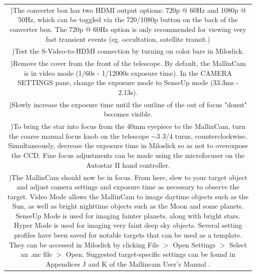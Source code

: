 \documentclass[12pt,titlepage]{article}
\newcounter{rowcount}
\newcommand{\step}{\stepcounter{rowcount}\therowcount)\hspace*{\tabcolsep}}
\begin{document}
\begin{longtable}{c}    
    \multicolumn{1}{m{\textwidth}}{\step The converter box has two HDMI output options: 720p @ 60Hz and 1080p @ 50Hz, which can be toggled via the 720/1080p button on the back of the converter box. The 720p @ 60Hz option is only recommended for viewing very fast transient events (eg. occultation, satellite transit.)} \\[2em]
    
    \multicolumn{1}{m{\textwidth}}{\step Test the S-Video-to-HDMI connection by turning on color bars in Miloslick.} \\
    
    \multicolumn{1}{m{\textwidth}}{\step Remove the cover from the front of the telescope. By default, the MallinCam is in video mode (1/60s - 1/12000s exposure time). In the CAMERA SETTINGS pane, change the exposure mode to SenseUp mode (33.3ms - 2.13s).} \\
   
    \multicolumn{1}{m{\textwidth}}{\step Slowly increase the exposure time until the outline of the out of focus "donut" becomes visible.}\\
    
    \multicolumn{1}{m{\textwidth}}{\step To bring the star into focus from the 40mm eyepiece to the MallinCam, turn the coarse manual focus knob on the telescope $\sim$3 3/4 turns, counterclockwise. Simultaneously, decrease the exposure time in Miloslick so as not to overexpose the CCD. Fine focus adjustments can be made using the microfocuser on the Autostar II hand controller.}\\
    
   \multicolumn{1}{m{\textwidth}}{\step The MallinCam should now be in focus. From here, slew to your target object and adjust camera settings and exposure time as necessary to observe the target. Video Mode allows the MallinCam to image daytime objects such as the Sun, as well as bright nighttime objects such as the Moon and some planets. SenseUp Mode is used for imaging fainter planets, along with bright stars. Hyper Mode is used for imaging very faint deep sky objects. Several setting profiles have been saved for notable targets that can be used as a template. They can be accessed in Miloslick by clicking File $>$ Open Settings $>$ Select an .mc file $>$ Open. Suggested target-specific settings can be found in Appendices J and K of the Mallincam User's Manual \cite{mallincam}.}
\end{longtable}
\end{document}
